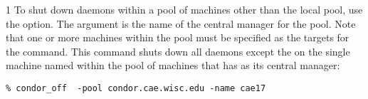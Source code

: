 \begin{ManPage}{\label{man-condor-off}}{1}
To shut down daemons within a pool of machines other than the
local pool, use the  option.
The argument is the name of the central manager for the pool.
Note that one or more machines within the pool must be
specified as the targets for the command.
This command shuts down all daemons except the 
on the single machine named  within the
pool of machines that has  as
its central manager:
\begin{verbatim}
% condor_off  -pool condor.cae.wisc.edu -name cae17
\end{verbatim}

\end{ManPage}
